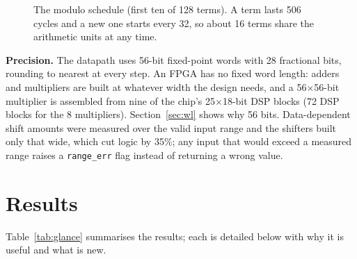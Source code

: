 \documentclass[11pt,a4paper]{article}
\begin{document}
\begin{figure}[H]
\centering
{}
\caption{The modulo schedule (first ten of 128 terms). A term lasts 506 cycles and a
new one starts every 32, so about 16 terms share the arithmetic units at any time.}
\label{fig:sched}
\end{figure}

\textbf{Precision.} The datapath uses 56-bit fixed-point words with 28 fractional
bits, rounding to nearest at every step. An FPGA has no fixed word length: adders and
multipliers are built at whatever width the design needs, and a 56$\times$56-bit
multiplier is assembled from nine of the chip's 25$\times$18-bit DSP blocks (72 DSP
blocks for the 8 multipliers). Section~\ref{sec:wl} shows why 56 bits. Data-dependent shift amounts were measured
over the valid input range and the shifters built only that wide, which cut logic by
35\%; any input that would exceed a measured range raises a \texttt{range\_err} flag
instead of returning a wrong value.

\section{Results}

Table~\ref{tab:glance} summarises the results; each is detailed below with why it
is useful and what is new.
\end{document}
